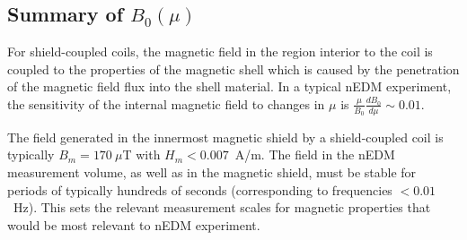 \subsection{Summary of $B_0(\mu)$ \label{sec:theory_summary}}

For shield-coupled coils, the magnetic field in the region interior to
the coil is coupled to the properties of the magnetic shell which is
caused by the penetration of the magnetic field flux into the shell
material. In a typical nEDM experiment, the sensitivity of the
internal magnetic field to changes in $\mu$ is
$\frac{\mu}{B_0}\frac{dB_0}{d\mu}\sim 0.01$.

The field generated in the innermost magnetic shield by a
shield-coupled coil is typically $B_m=170~\mu$T with $H_m<0.007$~A/m.
The field in the nEDM measurement volume, as well as in the magnetic
shield, must be stable for periods of typically hundreds of seconds
(corresponding to frequencies $<0.01$~Hz).  This sets the relevant
measurement scales for magnetic properties that would be most relevant
to nEDM experiment.
